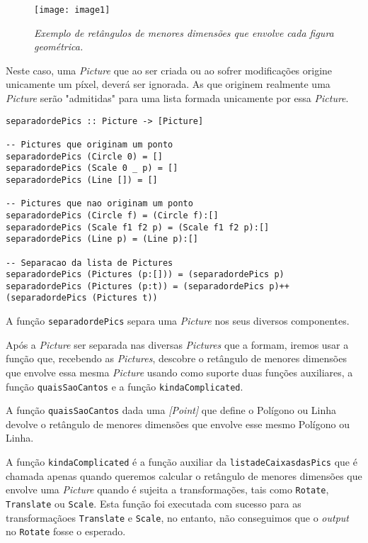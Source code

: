 \documentclass[a4paper,12pt]{report}
\begin{document}
\begin{figure}[h]
	\centering
	\texttt{[image: image1]}
	\caption{\small\sl Exemplo de retângulos de menores dimensões que envolve cada figura geométrica.}
	\captionsetup[figure]{list=yes}
\end{figure}

Neste caso, uma {\sl Picture} que ao ser criada ou ao sofrer modificações origine unicamente um píxel, deverá ser ignorada. As que originem realmente uma {\sl Picture} serão "admitidas" para uma lista formada unicamente por essa {\sl Picture}. 
\\
\begin{lstlisting}[caption={\small\sl Alguns exemplos da ação da função {\footnotesize\tt separadordePics} nas listas de Pictures.}]
separadordePics :: Picture -> [Picture]

-- Pictures que originam um ponto
separadordePics (Circle 0) = []
separadordePics (Scale 0 _ p) = []
separadordePics (Line []) = []

-- Pictures que nao originam um ponto
separadordePics (Circle f) = (Circle f):[]
separadordePics (Scale f1 f2 p) = (Scale f1 f2 p):[]
separadordePics (Line p) = (Line p):[]

-- Separacao da lista de Pictures
separadordePics (Pictures (p:[])) = (separadordePics p)
separadordePics (Pictures (p:t)) = (separadordePics p)++(separadordePics (Pictures t))
\end{lstlisting}

A função {\footnotesize\tt separadordePics} separa uma {\sl Picture} nos seus diversos componentes.

Após a {\sl Picture} ser separada nas diversas {\sl Pictures} que a formam, iremos usar a função que, recebendo as {\sl Pictures}, descobre o retângulo de menores dimensões que envolve essa mesma {\sl Picture} usando como suporte duas funções auxiliares, a função {\footnotesize\tt quaisSaoCantos} e a função {\footnotesize\tt kindaComplicated}. 

A função {\footnotesize\tt quaisSaoCantos} dada uma {\sl [Point]} que define o Polígono ou Linha devolve o retângulo de menores dimensões que envolve esse mesmo Polígono ou Linha.

A função {\footnotesize\tt kindaComplicated} é a função auxiliar da {\footnotesize\tt listadeCaixasdasPics} que é chamada apenas quando queremos calcular o retângulo de menores dimensões que envolve uma {\sl Picture} quando é sujeita a transformações, tais como {\footnotesize\tt Rotate}, {\footnotesize\tt Translate} ou {\footnotesize\tt Scale}. Esta função foi executada com sucesso para as transformaçãoes {\footnotesize\tt Translate} e {\footnotesize\tt Scale}, no entanto, não conseguimos que o {\sl output} no {\footnotesize\tt Rotate} fosse o esperado. 
\end{document}
